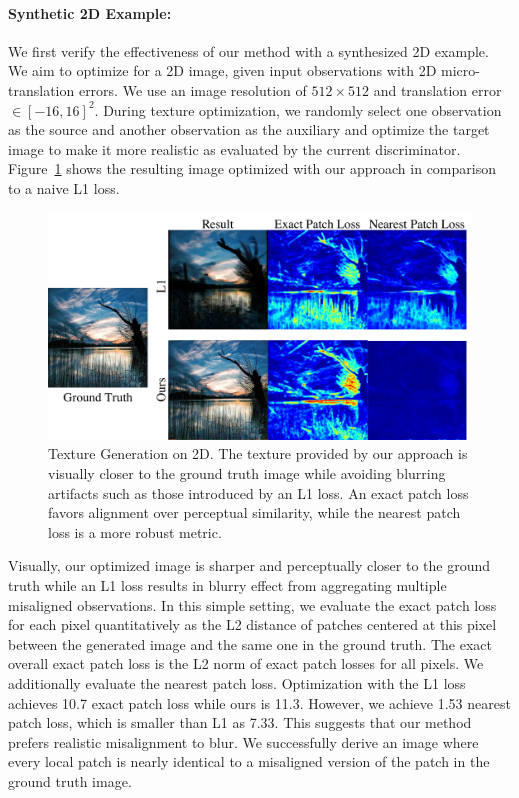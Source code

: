 \paragraph*{Synthetic 2D Example:}
We first verify the effectiveness of our method with a synthesized 2D example. 
We aim to optimize for a 2D image, given input observations with 2D micro-translation errors.
We use an image resolution of $512\times 512$ and translation error $\in[-16,16]^2$. 
During texture optimization,  we randomly select one observation as the source and another observation as the auxiliary and optimize the target image to make it more realistic as evaluated by the current discriminator. 
Figure~\ref{fig:3dlite-2d-example} shows the resulting image optimized with our approach in comparison to a naive L1 loss.
\begin{figure}
    \centering
    \includegraphics[width=0.8\linewidth]{texturegen/figures/exp2d.pdf}
    \caption{Texture Generation on 2D. The texture provided by our approach is visually closer to the ground truth image while avoiding blurring artifacts such as those introduced by an L1 loss.
    An exact patch loss favors alignment over perceptual similarity, while the nearest patch loss is a more robust metric.
    }
    \label{fig:3dlite-2d-example}
\end{figure}

Visually, our optimized image is sharper and perceptually closer to the ground truth while an  L1 loss results in blurry effect from aggregating multiple misaligned observations. 
In this simple setting, we evaluate the exact patch loss for each pixel quantitatively as the L2 distance of patches centered at this pixel between the generated image and the same one in the ground truth. The exact overall exact patch loss is the L2 norm of exact patch losses for all pixels. We additionally evaluate the nearest patch loss.
Optimization with the L1 loss achieves 10.7 exact patch loss while ours is 11.3. However, we achieve 1.53 nearest patch loss, which is smaller than L1 as 7.33. This suggests that our method prefers realistic misalignment to blur. We successfully derive an image where every local patch is nearly identical to a misaligned version of the patch in the ground truth image.

